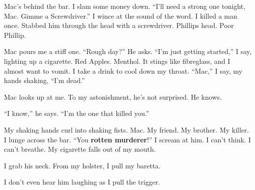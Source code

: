 Mac's behind the bar. I slam some money down. ``I'll need a strong
one tonight, Mac. Gimme a Screwdriver.'' I wince at the sound of the
word. I killed a man once. Stabbed him through the head with a
screwdriver. Phillips head. Poor Phillip.



Mac pours me a stiff one. ``Rough day?'' He asks. ``I'm just getting
started,'' I say, lighting up a cigarette. Red Apples. Menthol. It
stings like fibreglass, and I almost want to vomit. I take a drink
to cool down my throat. ``Mac,'' I say, my hands shaking, ``I'm
dead.''



Mac looks up at me. To my astonishment, he's not surprised. He
knows.



``I know,'' he says. ``I'm the one that killed you.''



My shaking hands curl into shaking fists. Mac. My friend. My brother. My
killer. I lunge across the bar. ``You {\bf rotten murderer}!''  I scream
at him. I can't think. I can't breathe. My cigarette falls out of my
mouth.



I grab his neck. From my holster, I pull my baretta.



I don't even hear him laughing as I pull the trigger. 

 




